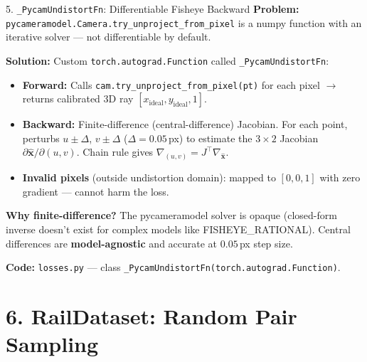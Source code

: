 \documentclass[aspectratio=169, 12pt]{beamer}
\begin{document}
\begin{frame}{5. \texttt{\_PycamUndistortFn}: Differentiable Fisheye Backward}
\small
\textbf{Problem:} \texttt{pycameramodel.Camera.try\_unproject\_from\_pixel} is a
numpy function with an iterative solver --- not differentiable by default.

\medskip
\textbf{Solution:} Custom \texttt{torch.autograd.Function} called
\texttt{\_PycamUndistortFn}:

\begin{itemize}\setlength{\itemsep}{2pt}
    \item \textbf{Forward:} Calls \texttt{cam.try\_unproject\_from\_pixel(pt)} for each
          pixel $\to$ returns calibrated 3D ray $[x_{\mathrm{ideal}}, y_{\mathrm{ideal}}, 1]$.
    \item \textbf{Backward:} Finite-difference (central-difference) Jacobian.
          For each point, perturbs $u \pm \Delta$, $v \pm \Delta$ ($\Delta = 0.05$\,px)
          to estimate the $3 \times 2$ Jacobian $\partial\hat{\mathbf{x}} / \partial(u,v)$.
          Chain rule gives $\nabla_{(u,v)} = J^\top \nabla_{\hat{\mathbf{x}}}$.
    \item \textbf{Invalid pixels} (outside undistortion domain): mapped to $[0,0,1]$
          with zero gradient --- cannot harm the loss.
\end{itemize}

\medskip
\textbf{Why finite-difference?}
The pycameramodel solver is opaque (closed-form inverse doesn't exist for
complex models like FISHEYE\_RATIONAL).  Central differences are
\textbf{model-agnostic} and accurate at $0.05$\,px step size.

\medskip
\textbf{Code:} \texttt{losses.py} --- class \texttt{\_PycamUndistortFn(torch.autograd.Function)}.
\end{frame}


\section{6. RailDataset: Random Pair Sampling}
\end{document}
